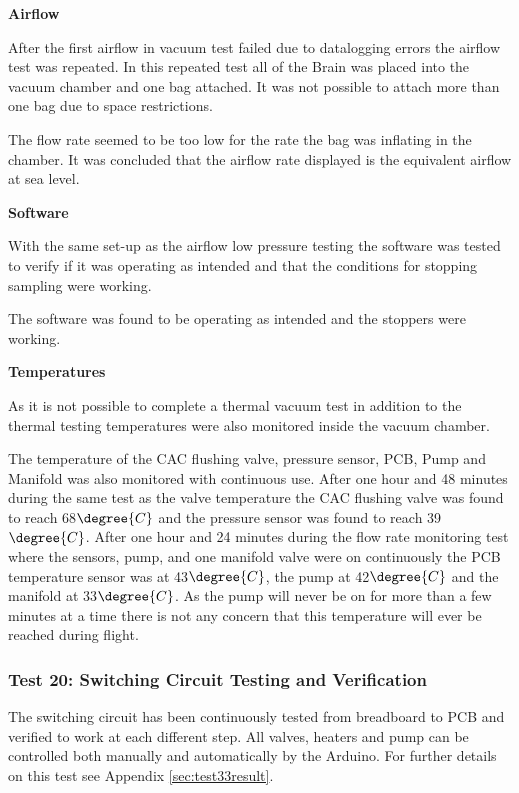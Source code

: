 \documentclass[a4paper,12pt,oneside]{article}
\begin{document}
\textbf{Airflow}

After the first airflow in vacuum test failed due to datalogging errors the airflow test was repeated. In this repeated test all of the Brain was placed into the vacuum chamber and one bag attached. It was not possible to attach more than one bag due to space restrictions. 

The flow rate seemed to be too low for the rate the bag was inflating in the chamber. It was concluded that the airflow rate displayed is the equivalent airflow at sea level. 

\textbf{Software}

With the same set-up as the airflow low pressure testing the software was tested to verify if it was operating as intended and that the conditions for stopping sampling were working.

The software was found to be operating as intended and the stoppers were working. 

\textbf{Temperatures}

As it is not possible to complete a thermal vacuum test in addition to the thermal testing  temperatures were also monitored inside the vacuum chamber.

The temperature of the CAC flushing valve, pressure sensor, PCB, Pump and Manifold was also monitored with continuous use. After one hour and 48 minutes during the same test as the valve temperature the CAC flushing valve was found to reach 68$\degree{C}$ and the pressure sensor was found to reach 39$\degree{C}$. After one hour and 24 minutes during the flow rate monitoring test where the sensors, pump, and one manifold valve were on continuously the PCB temperature sensor was at 43$\degree{C}$, the pump at 42$\degree{C}$ and the manifold at 33$\degree{C}$. As the pump will never be on for more than a few minutes at a time there is not any concern that this temperature will ever be reached during flight.

\subsubsection{Test 20: Switching Circuit Testing and Verification}

The switching circuit has been continuously tested from breadboard to PCB and verified to work at each different step. All valves, heaters and pump can be controlled both manually and automatically by the Arduino. For further details on this test see Appendix \ref{sec:test33result}.
\end{document}
